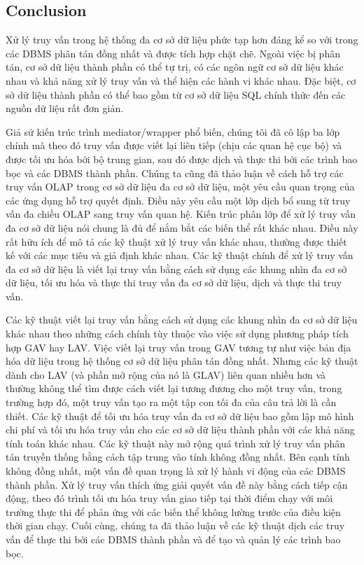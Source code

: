 \documentclass[a4paper]{article}
\begin{document}
\subsection{Conclusion}
Xử lý truy vấn trong hệ thống đa cơ sở dữ liệu phức tạp hơn đáng kể so với trong các DBMS phân tán đồng nhất và được tích hợp chặt chẽ. Ngoài việc bị phân tán, cơ sở dữ liệu thành phần có thể tự trị, có các ngôn ngữ cơ sở dữ liệu khác nhau và khả năng xử lý truy vấn và thể hiện các hành vi khác nhau. Đặc biệt, cơ sở dữ liệu thành phần có thể bao gồm từ cơ sở dữ liệu SQL chính thức đến các nguồn dữ liệu rất đơn giản.


Giả sử kiến trúc trình mediator/wrapper phổ biến, chúng tôi đã cô lập ba lớp chính mà theo đó truy vấn được viết lại liên tiếp (chịu các quan hệ cục bộ) và được tối ưu hóa bởi bộ trung gian, sau đó được dịch và thực thi bởi các trình bao bọc và các DBMS thành phần. Chúng ta cũng đã thảo luận về cách hỗ trợ các truy vấn OLAP trong cơ sở dữ liệu đa cơ sở dữ liệu, một yêu cầu quan trọng của các ứng dụng hỗ trợ quyết định. Điều này yêu cầu một lớp dịch bổ sung từ truy vấn đa chiều OLAP sang truy vấn quan hệ. Kiến trúc phân lớp để xử lý truy vấn đa cơ sở dữ liệu nói chung là đủ để nắm bắt các biến thể rất khác nhau. Điều này rất hữu ích để mô tả các kỹ thuật xử lý truy vấn khác nhau, thường được thiết kế với các mục tiêu và giả định khác nhau. Các kỹ thuật chính để xử lý truy vấn đa cơ sở dữ liệu là viết lại truy vấn bằng cách sử dụng các khung nhìn đa cơ sở dữ liệu, tối ưu hóa và thực thi truy vấn đa cơ sở dữ liệu, dịch và thực thi truy vấn.


Các kỹ thuật viết lại truy vấn bằng cách sử dụng các khung nhìn đa cơ sở dữ liệu khác nhau theo những cách chính tùy thuộc vào việc sử dụng phương pháp tích hợp GAV hay LAV. Việc viết lại truy vấn trong GAV tương tự như việc bản địa hóa dữ liệu trong hệ thống cơ sở dữ liệu phân tán đồng nhất. Nhưng các kỹ thuật dành cho LAV (và phần mở rộng của nó là GLAV) liên quan nhiều hơn và thường không thể tìm được cách viết lại tương đương cho một truy vấn, trong trường hợp đó, một truy vấn tạo ra một tập con tối đa của câu trả lời là cần thiết. Các kỹ thuật để tối ưu hóa truy vấn đa cơ sở dữ liệu bao gồm lập mô hình chi phí và tối ưu hóa truy vấn cho các cơ sở dữ liệu thành phần với các khả năng tính toán khác nhau. Các kỹ thuật này mở rộng quá trình xử lý truy vấn phân tán truyền thống bằng cách tập trung vào tính không đồng nhất. Bên cạnh tính không đồng nhất, một vấn đề quan trọng là xử lý hành vi động của các DBMS thành phần. Xử lý truy vấn thích ứng giải quyết vấn đề này bằng cách tiếp cận động, theo đó trình tối ưu hóa truy vấn giao tiếp tại thời điểm chạy với môi trường thực thi để phản ứng với các biến thể không lường trước của điều kiện thời gian chạy. Cuối cùng, chúng ta đã thảo luận về các kỹ thuật dịch các truy vấn để thực thi bởi các DBMS thành phần và để tạo và quản lý các trình bao bọc.
\end{document}
